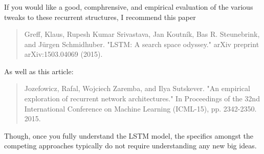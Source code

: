 \documentclass[xetex,mathserif,serif,aspectratio=169]{beamer}
\begin{document}
\begin{frame}[fragile] \frametitle{} \oldB \small

If you would like a good, comphrensive, and empirical
evaluation of the various tweaks to these recurrent
structures, I recommend this paper
\begin{quote}
Greff, Klaus, Rupesh Kumar Srivastava, Jan Koutník, Bas R. Steunebrink,
and Jürgen Schmidhuber. "LSTM: A search space odyssey."
arXiv preprint arXiv:1503.04069 (2015).
\end{quote}
As well as this article:
\begin{quote}
Jozefowicz, Rafal, Wojciech Zaremba, and Ilya Sutskever.
"An empirical exploration of recurrent network architectures."
In Proceedings of the 32nd International Conference on Machine
Learning (ICML-15), pp. 2342-2350. 2015.
\end{quote}
Though, once you fully understand the LSTM model, the
specifics amongst the competing approaches typically do not
require understanding any new big ideas.

\end{frame}

\begin{frame}[fragile] \frametitle{} \oldB \small


\end{frame}

\begin{frame}[fragile] \frametitle{} \oldB \small


\end{frame}

\begin{frame}[fragile] \frametitle{} \oldB \small


\end{frame}
\end{document}
